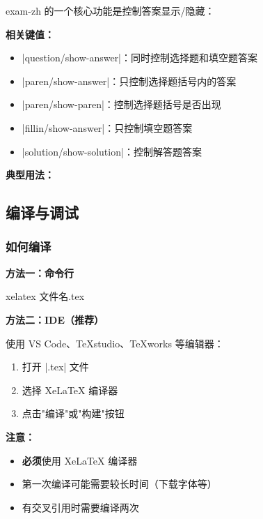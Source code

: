 exam-zh 的一个核心功能是控制答案显示/隐藏：

\textbf{相关键值：}
\begin{itemize}
  \item |question/show-answer|：同时控制选择题和填空题答案
  \item |paren/show-answer|：只控制选择题括号内的答案
  \item |paren/show-paren|：控制选择题括号是否出现
  \item |fillin/show-answer|：只控制填空题答案
  \item |solution/show-solution|：控制解答题答案
\end{itemize}

\textbf{典型用法：}
\begin{latexcode}

\end{latexcode}


\subsection{编译与调试}

\subsubsection{如何编译}

\textbf{方法一：命令行}
\begin{shellcode}[morekeywords={xelatex}]
  xelatex 文件名.tex
\end{shellcode}

\textbf{方法二：IDE（推荐）}

使用 VS Code、TeXstudio、TeXworks 等编辑器：
\begin{enumerate}
  \item 打开 |.tex| 文件
  \item 选择 XeLaTeX 编译器
  \item 点击"编译"或"构建"按钮
\end{enumerate}

\textbf{注意：}
\begin{itemize}
  \item \textbf{必须}使用 XeLaTeX 编译器
  \item 第一次编译可能需要较长时间（下载字体等）
  \item 有交叉引用时需要编译两次
\end{itemize}

